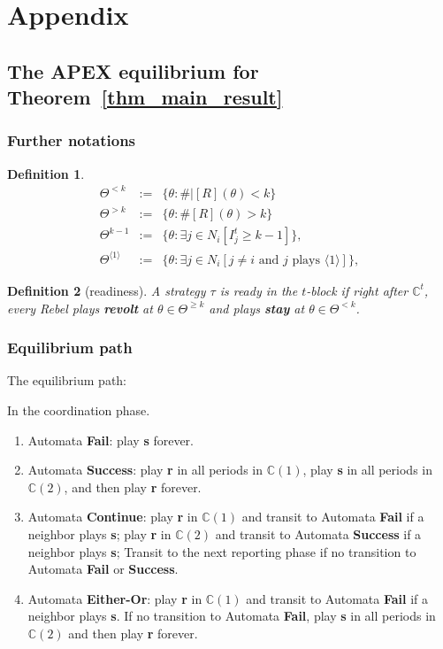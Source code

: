 \documentclass[12pt,letter]{article}
\newcommand{\Kappa}{\mathbb{C}}
\newtheorem{definition}{Definition}[section]
\theoremstyle{definition}
\theoremstyle{definition}
\theoremstyle{remark}
\theoremstyle{claim}
\begin{document}


\appendix
\section{Appendix}
\subsection{The APEX equilibrium for Theorem~\ref{thm_main_result}}
\subsubsection{Further notations}

\begin{definition}
\begin{eqnarray*}
\Theta^{<k} & := & \{\theta:\#|[R](\theta)<k\} \\
\Theta^{>k} & := & \{\theta:\#[R](\theta)>k\} \\
\Theta^{k-1} & := & \{\theta:\exists j\in N_i[I^t_j\geq k-1]\},\\
\Theta^{\langle 1 \rangle} & := & \{\theta:\exists j\in N_i[j\neq i\text{ and }j\text{ plays }\langle 1 \rangle]\},
\end{eqnarray*}
\end{definition}

\begin{definition}[readiness]
A strategy $\tau$ is ready in the $t$-block if right after $\Kappa^t$, every Rebel plays \textbf{revolt} at $\theta\in \Theta^{\geq k}$ and plays \textbf{stay} at $\theta\in \Theta^{<k}$.
\end{definition}

\subsubsection{Equilibrium path}
\label{sec:equilibrium_path}




The equilibrium path:

In the coordination phase.

\begin{enumerate}
\item Automata \textbf{Fail}: play \textbf{s} forever.
\item Automata \textbf{Success}: play \textbf{r} in all periods in $\Kappa(1)$, play \textbf{s} in all periods in $\Kappa(2)$, and then play \textbf{r} forever.
\item Automata \textbf{Continue}: play \textbf{r} in $\Kappa(1)$ and transit to Automata \textbf{Fail} if a neighbor plays \textbf{s}; play \textbf{r} in $\Kappa(2)$ and transit to Automata \textbf{Success} if a neighbor plays \textbf{s}; Transit to the next reporting phase if no transition to Automata \textbf{Fail} or \textbf{Success}. 
\item Automata \textbf{Either-Or}: play \textbf{r} in $\Kappa(1)$ and transit to Automata \textbf{Fail} if a neighbor plays \textbf{s}. If no transition to Automata \textbf{Fail}, play \textbf{s} in all periods in $\Kappa(2)$ and then play \textbf{r} forever.
\end{enumerate}
\end{document}
